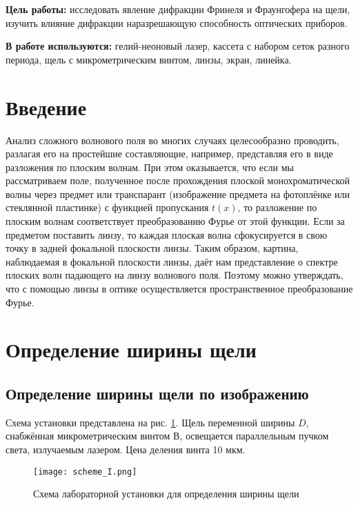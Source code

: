 


    

    \textbf{Цель работы:} исследовать явление дифракции Фринеля и Фраунгофера на щели,
    изучить влияние дифракции наразрешающую способность оптических приборов.

    \textbf{В работе используются:} гелий-неоновый лазер, кассета с набором
    сеток разного периода, щель с микрометрическим винтом, линзы,
    экран, линейка.

    \section{Введение}

    Анализ сложного волнового поля во многих случаях целесообразно проводить, разлагая его на простейшие составляющие, например,
    представляя его в виде разложения по плоским волнам. При этом оказывается, что если мы рассматриваем поле, полученное после прохождения плоской монохроматической волны через предмет или транспарант (изображение предмета на фотоплёнке или стеклянной пластинке)
    с функцией пропускания $t(x)$, то разложение по плоским волнам соответствует преобразованию Фурье от этой функции. Если за предметом
    поставить линзу, то каждая плоская волна сфокусируется в свою точку
    в задней фокальной плоскости линзы. Таким образом, картина, наблюдаемая в фокальной плоскости линзы, даёт нам представление о спектре плоских волн падающего на линзу волнового поля. Поэтому можно
    утверждать, что с помощью линзы в оптике осуществляется пространственное преобразование Фурье.

    \section{Определение ширины щели}
    \subsection{Определение ширины щели по изображению}
    Схема установки представлена на рис. \ref{fig:scheme_I}. Щель переменной ширины $D$, снабжённая микрометрическим винтом $В$, освещается параллельным пучком света, излучаемым лазером. Цена деления винта 10 мкм.
    
    \begin{figure}
    	\centering
    	\texttt{[image: scheme\_I.png]}
    	\caption{Схема лабораторной установки для определения ширины щели}
    	\label{fig:scheme_I}
    \end{figure}

